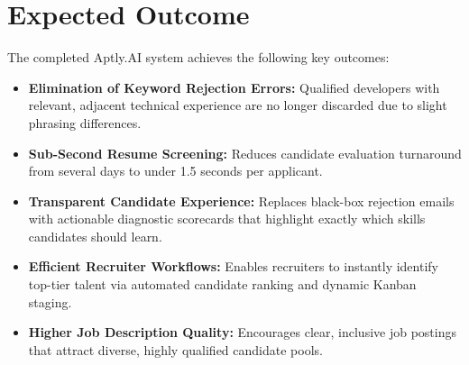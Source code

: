 \documentclass[12pt, a4paper]{article}
\begin{document}
\section{Expected Outcome}
The completed Aptly.AI system achieves the following key outcomes:
\begin{itemize}[leftmargin=1.5em, itemsep=2.5pt]
    \item \textbf{Elimination of Keyword Rejection Errors:} Qualified developers with relevant, adjacent technical experience are no longer discarded due to slight phrasing differences.
    \item \textbf{Sub-Second Resume Screening:} Reduces candidate evaluation turnaround from several days to under 1.5 seconds per applicant.
    \item \textbf{Transparent Candidate Experience:} Replaces black-box rejection emails with actionable diagnostic scorecards that highlight exactly which skills candidates should learn.
    \item \textbf{Efficient Recruiter Workflows:} Enables recruiters to instantly identify top-tier talent via automated candidate ranking and dynamic Kanban staging.
    \item \textbf{Higher Job Description Quality:} Encourages clear, inclusive job postings that attract diverse, highly qualified candidate pools.
\end{itemize}

\end{document}
